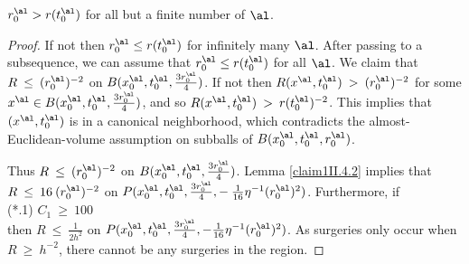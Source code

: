 \begin{lemma}
  \label{lem:kl-earlier-scalar-curvature-bounds-smaller-balls-from-lower-curvature-bound-scalar-curvature-lemma}

$r_0^\al > r(t_0^\al)$ for all but a finite number of $\al$.
\end{lemma}
\begin{proof}
If not then $r_0^\al \le r(t_0^\al)$ for
infinitely many
$\al$. After passing to a subsequence, we can assume
that $r_0^\al \le r(t_0^\al)$ for all $\al$. We  claim that
$R \: \le \: (r_0^\al)^{-2}$ on $B(x_0^\al, t_0^\al, \frac{3r_0^\al}{4})$.
If not then $R(x^\al, t_0^\al) \: > \: (r_0^\al)^{-2}$ for some
$x^\al \in B(x_0^\al, t_0^\al, \frac{3r_0^\al}{4})$, and so
$R(x^\al, t_0^\al) \: > \: r(t_0^\al)^{-2}$.
This implies that
$(x^\al, t_0^\al)$ is in a canonical neighborhood, which
contradicts the almost-Euclidean-volume assumption on subballs of
$B(x_0^\al, t_0^\al, r_0^\al)$.

Thus $R \: \le \: (r_0^\al)^{-2}$ on
$B(x_0^\al, t_0^\al, \frac{3r_0^\al}{4})$.
Lemma \ref{claim1II.4.2}
implies that
$R \: \le \: 16 \: (r_0^\al)^{-2}$ on
$P(x^\al_0, t^\al_0,  \frac{3r_0^\al}{4},
- \: \frac{1}{16} \eta^{-1} (r_0^\al)^2)$.
Furthermore, if \\
(*.1) $C_1 \: \ge \: 100$ \\
then $R \: \le \: \frac{1}{2 h^2}$ on $P(x_0^\al, t_0^\al, \frac{3r_0^\al}{4},
- \frac{1}{16} \eta^{-1} (r_0^\al)^2)$.
As surgeries only occur when $R \: \ge \: h^{-2}$,
there cannot be any surgeries in the region.


\end{proof}
